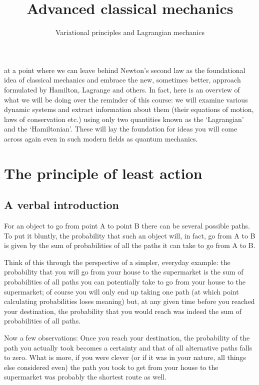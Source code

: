 \documentclass[english,seminar,headertitle]{lecture}
\title{Advanced classical mechanics}
\subtitle{Variational principles and Lagrangian mechanics}
\author{}
\date{}{}{}
\begin{document}
%
\newcommand{\act}{S[\mathbf{r}]}
\newcommand{\dt}{\textrm{d}t\;}
%
\noindent{} at a point where we can leave behind Newton's second law as the foundational idea of classical mechanics and embrace the new, sometimes better, approach formulated by Hamilton, Lagrange and others. In fact, here is an overview of what we will be doing over the reminder of this course: we will examine various dynamic systems and extract information about them (their equations of motion, laws of conservation etc.) using only two quantities known as the `Lagrangian' and the `Hamiltonian'. These will lay the foundation for ideas you will come across again even in such modern fields as quantum mechanics.
%
\section{The principle of least action}
\subsection{A verbal introduction}
%
For an object to go from point A to point B there can be several possible paths. To put it bluntly, the probability that such an object will, in fact, go from A to B is given by the sum of probabilities of all the paths it can take to go from A to B.

Think of this through the perspective of a simpler, everyday example: the probability that you will go from your house to the supermarket is the sum of probabilities of all paths you can potentially take to go from your house to the supermarket; of course you will only end up taking one path (at which point calculating probabilities loses meaning) but, at any given time before you reached your destination, the probability that you would reach was indeed the sum of probabilities of all paths.

Now a few observations: Once you reach your destination, the probability of the path you actually took becomes a certainty and that of all alternative paths falls to zero. What is more, if you were clever (or if it was in your nature, all things else considered even) the path you took to get from your house to the supermarket was probably the shortest route as well.
\end{document}
